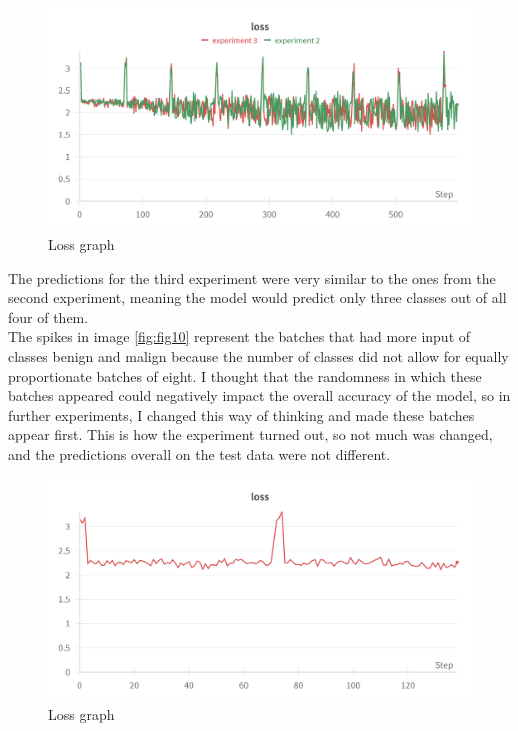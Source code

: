 \begin{figure}[ht!]
    \centering
    \includegraphics[width=1\textwidth]{figures/Figure14.png}
    \caption{Loss graph}
    \label{fig:fig13}
\end{figure}
The predictions for the third experiment were very similar to the ones from the second experiment, meaning the model would predict only three classes out of all four of them.\\
The spikes in image \ref{fig:fig10} represent the batches that had more input of classes benign and malign because the number of classes did not allow for equally proportionate batches of eight. I thought that the randomness in which these batches appeared could negatively impact the overall accuracy of the model, so in further experiments, I changed this way of thinking and made these batches appear first. This is how the experiment turned out, so not much was changed, and the predictions overall on the test data were not different.\\
\begin{figure}[ht!]
    \centering
    \includegraphics[width=1\textwidth]{figures/Figure15.png}
    \caption{Loss graph}
    \label{fig:fig14}
\end{figure}

